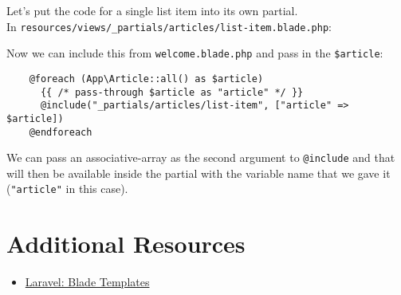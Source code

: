 Let's put the code for a single list item into its own partial.
\\

In \texttt{resources/views/_partials/articles/list-item.blade.php}:


Now we can include this from \texttt{welcome.blade.php} and pass in the \texttt{\$article}:

\begin{verbatim}
    @foreach (App\Article::all() as $article)
      {{ /* pass-through $article as "article" */ }}
      @include("_partials/articles/list-item", ["article" => $article])
    @endforeach
\end{verbatim}

We can pass an associative-array as the second argument to \texttt{@include} and that will then be available inside the partial with the variable name that we gave it (\texttt{"article"} in this case).

\section{Additional Resources}

\begin{itemize}[leftmargin=*]
    \item \href{http://laravel.com/docs/master/blade}{Laravel: Blade Templates}
\end{itemize}
